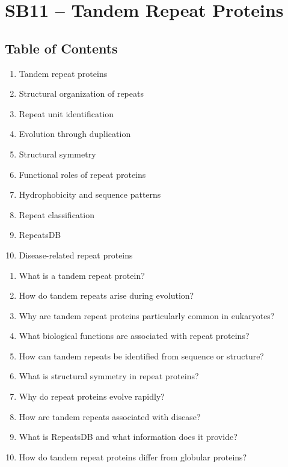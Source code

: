 \section{SB11 -- Tandem Repeat Proteins}

\subsection*{Table of Contents}

\begin{enumerate}
\item Tandem repeat proteins
\item Structural organization of repeats
\item Repeat unit identification
\item Evolution through duplication
\item Structural symmetry
\item Functional roles of repeat proteins
\item Hydrophobicity and sequence patterns
\item Repeat classification
\item RepeatsDB
\item Disease-related repeat proteins
\end{enumerate}


\begin{enumerate}
\item{What is a tandem repeat protein?}
\item{How do tandem repeats arise during evolution?}
\item{Why are tandem repeat proteins particularly common in eukaryotes?}
\item{What biological functions are associated with repeat proteins?}
\item{How can tandem repeats be identified from sequence or structure?}
\item{What is structural symmetry in repeat proteins?}
\item{Why do repeat proteins evolve rapidly?}
\item{How are tandem repeats associated with disease?}
\item{What is RepeatsDB and what information does it provide?}
\item{How do tandem repeat proteins differ from globular proteins?}
\end{enumerate}